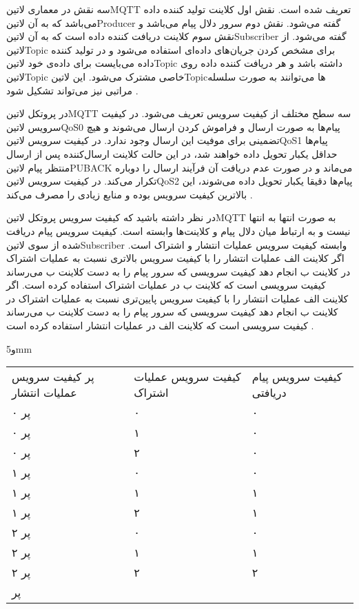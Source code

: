 سه نقش در معماری ‌لاتین{MQTT} تعریف شده است. نقش اول کلاینت تولید کننده داده می‌باشد که به آن ‌لاتین{Producer} گفته می‌شود. نقش دوم سرور دلال پیام می‌باشد و نقش سوم کلاینت دریافت کننده داده است که به آن ‌لاتین{Subscriber} گفته می‌شود.
از ‌لاتین{Topic} برای مشخص کردن جریان‌های داده‌ای استفاده می‌شود و در تولید کننده داده می‌بایست برای داده‌ی خود ‌لاتین{Topic} داشته باشد و هر دریافت کننده داده روی ‌لاتین{Topic} خاصی مشترک می‌شود.
این ‌لاتین{Topic}ها می‌توانند به صورت سلسله مراتبی نیز می‌تواند تشکیل شود
.

در پروتکل ‌لاتین{‌MQTT} سه سطح مختلف از کیفیت سرویس تعریف می‌شود. در کیفیت سرویس ‌لاتین{QoS0} پیام‌ها به صورت ارسال و فراموش کردن ارسال می‌شوند و هیچ تضمینی برای موفیت این ارسال وجود ندارد.
در کیفیت سرویس ‌لاتین{QoS1} پیام‌ها حداقل یکبار تحویل داده خواهند شد، در این حالت کلاینت ارسال‌کننده پس از ارسال منتظر پیام ‌لاتین{PUBACK} می‌ماند و در صورت عدم دریافت آن فرآیند ارسال را دوباره تکرار می‌کند.
در کیفیت سرویس ‌لاتین{QoS2} پیام‌ها دقیقا یکبار تحویل داده می‌شوند، این بالاترین کیفیت سرویس بوده و منابع زیادی را مصرف می‌کند
.

در نظر داشته باشید که کیفیت سرویس پروتکل ‌لاتین{MQTT} به صورت انتها به انتها نیست و به ارتباط میان دلال پیام و کلاینت‌ها وابسته است.
کیفیت سرویس پیام دریافت شده از سوی ‌لاتین{Subscriber} وابسته کیفیت سرویس عملیات انتشار و اشتراک است. اگر کلاینت الف عملیات انتشار را با کیفیت سرویس بالاتری
نسبت به عملیات اشتراک در کلاینت ب انجام دهد کیفیت سرویسی که سرور پیام را به دست کلاینت ب می‌رساند کیفیت سرویسی است که کلاینت ب در عملیات اشتراک استفاده کرده است.
اگر کلاینت الف عملیات انتشار را با کیفیت سرویس پایین‌تری نسبت به عملیات اشتراک در کلاینت ب انجام دهد کیفیت سرویسی که سرور پیام را به دست کلاینت ب می‌رساند کیفیت سرویسی است که
کلاینت الف در عملیات انتشار استفاده کرده است
.

‌و{5mm}
\begin{tabularx}{\textwidth}{|X|X|X|}
‌پر
کیفیت سرویس عملیات انتشار & کیفیت سرویس عملیات اشتراک & کیفیت سرویس پیام دریافتی \\
‌پر
۰ & ۰ & ۰ \\
‌پر
۰ & ۱ & ۰ \\
‌پر
۰ & ۲ & ۰ \\
‌پر
۱ & ۰ & ۰ \\
‌پر
۱ & ۱ & ۱ \\
‌پر
۱ & ۲ & ۱ \\
‌پر
۲ & ۰ & ۰ \\
‌پر
۲ & ۱ & ۱ \\
‌پر
۲ & ۲ & ۲ \\
‌پر
\end{tabularx}

